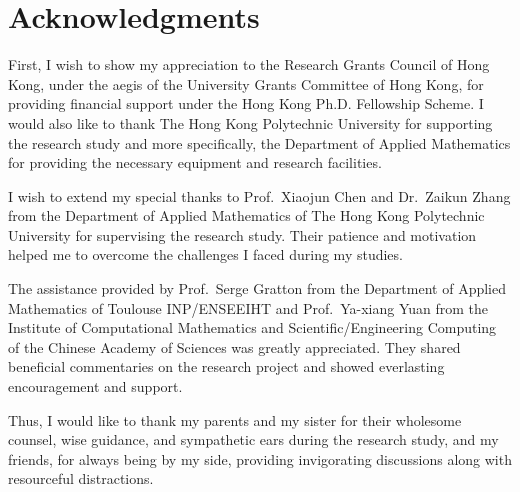 %
%
%
\chapter*{Acknowledgments}
\label{ch:acknowledgments}

First, I wish to show my appreciation to the Research Grants Council of Hong Kong, under the aegis of the University Grants Committee of Hong Kong, for providing financial support under the Hong Kong Ph.D. Fellowship Scheme.
I would also like to thank The Hong Kong Polytechnic University for supporting the research study and more specifically, the Department of Applied Mathematics for providing the necessary equipment and research facilities.

I wish to extend my special thanks to Prof.\ Xiaojun Chen and Dr.\ Zaikun Zhang from the Department of Applied Mathematics of The Hong Kong Polytechnic University for supervising the research study.
Their patience and motivation helped me to overcome the challenges I faced during my studies.

The assistance provided by Prof.\ Serge Gratton from the Department of Applied Mathematics of Toulouse INP/ENSEEIHT and Prof.\ Ya-xiang Yuan from the Institute of Computational Mathematics and Scientific/Engineering Computing of the Chinese Academy of Sciences was greatly appreciated.
They shared beneficial commentaries on the research project and showed everlasting encouragement and support.

Thus, I would like to thank my parents and my sister for their wholesome counsel, wise guidance, and sympathetic ears during the research study, and my friends, for always being by my side, providing invigorating discussions along with resourceful distractions.
